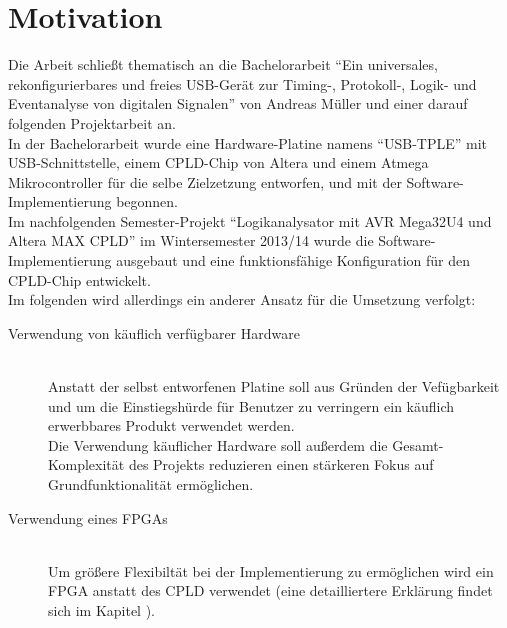 \clearpage

\section{Motivation}
\label{ch:Einfuehrung:Motivation}

Die Arbeit schließt thematisch an die Bachelorarbeit ``Ein universales, rekonfigurierbares und freies USB-Gerät zur Timing-, Protokoll-, Logik- und Eventanalyse von digitalen Signalen'' von Andreas Müller und einer darauf folgenden Projektarbeit an.\\
In der Bachelorarbeit wurde eine Hardware-Platine namens ``USB-TPLE'' mit USB-Schnittstelle, einem \acrshort{CPLD}-Chip von Altera und einem Atmega Mikrocontroller für die selbe Zielzetzung entworfen, und mit der Software-Implementierung begonnen\cite{ba:mueller}.\\  
Im nachfolgenden Semester-Projekt ``Logikanalysator mit AVR Mega32U4 und Altera MAX CPLD'' im Wintersemester 2013/14 wurde die Software-Implementierung ausgebaut und eine funktionsfähige Konfiguration für den CPLD-Chip entwickelt.\\

Im folgenden wird allerdings ein anderer Ansatz für die Umsetzung verfolgt:
\begin{description}
\item[Verwendung von käuflich verfügbarer Hardware] \hfill \\
Anstatt der selbst entworfenen Platine soll aus Gründen der Vefügbarkeit und um die Einstiegshürde für Benutzer zu verringern ein käuflich erwerbbares Produkt verwendet werden.\\
Die Verwendung käuflicher Hardware soll außerdem die Gesamt-Komplexität des Projekts reduzieren einen stärkeren Fokus auf Grundfunktionalität ermöglichen.
\item[Verwendung eines FPGAs] \hfill \\
Um größere Flexibiltät bei der Implementierung zu ermöglichen wird ein \gls{FPGA} anstatt des \gls{CPLD} verwendet (eine detailliertere Erklärung findet sich im Kapitel ).
\end{description}

